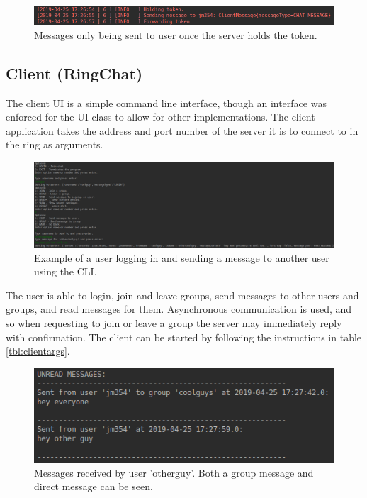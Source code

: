 \documentclass[12pt]{article}
\begin{document}
\begin{figure}[!ht]
	\centering
	\includegraphics[width=\linewidth]{images/exclusion}
	\caption{Messages only being sent to user once the server holds the token.}
	\label{fig:exclusion}
\end{figure}


\subsection{Client (RingChat)}

The client UI is a simple command line interface, though an interface was enforced for the UI class to allow for other implementations. The client application takes the address and port number of the server it is to connect to in the ring as arguments. 

\begin{figure}[!ht]
	\centering
	\includegraphics[width=\linewidth]{images/chat}
	\caption{Example of a user logging in and sending a message to another user using the CLI.}
	\label{fig:clientchat}
\end{figure}

The user is able to login, join and leave groups, send messages to other users and groups, and read messages for them. Asynchronous communication is used, and so when requesting to join or leave a group the server may immediately reply with confirmation. The client can be started by following the instructions in table \ref{tbl:clientargs}.

\begin{figure}[!ht]
	\centering
	\includegraphics[width=\linewidth]{images/received}
	\caption{Messages received by user 'otherguy'. Both a group message and direct message can be seen.}
	\label{fig:received}
\end{figure}
\end{document}
